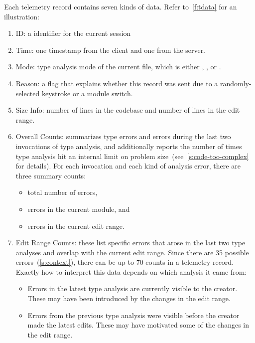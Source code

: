 \documentclass[english,submission,cleveref]{programming}
\begin{document}
Each telemetry record contains seven kinds of data.
Refer to~\cref{f:tdata} for an illustration:
\begin{enumerate}
  \item
    ID: a \panon{} identifier for the current session
  \item
    Time: one timestamp from the client and one from the server.
  \item
    Mode: type analysis mode of the current file, which is either \mnocheck{},
    \mnonstrict{}, or \mstrict{}.
  \item
    Reason: a flag that explains whether this record was sent due to a
    randomly-selected keystroke or a module switch.
  \item
    Size Info: number of lines in the codebase and number of lines in the edit range.
  \item
    Overall Counts: summarizes type errors and \FS{} errors during the
    last two invocations of type analysis, and additionally reports the number
    of times type analysis hit an internal limit on problem
    size~(see~\cref{s:code-too-complex} for details).
    For each invocation and each kind of
    analysis error, there are three summary counts:
    \begin{itemize}
      \item total number of errors,
      \item errors in the current module, and
      \item errors in the current edit range.
    \end{itemize}
  \item
    Edit Range Counts: these list specific errors that arose in the last two
    type analyses and overlap with the current edit range.
    Since there are 35 possible errors~(\cref{s:context}), there can be up to 70 counts
    in a telemetry record.
    Exactly how to interpret this data depends on which analysis it came from:
    \begin{itemize}
      \item
        Errors in the latest type analysis are currently visible to the
        creator.
        These may have been introduced by the changes in the edit range.
      \item
        Errors from the previous type analysis were visible before the creator
        made the latest edits.
        These may have motivated some of the changes in the edit range.
    \end{itemize}
\end{enumerate}
\end{document}
